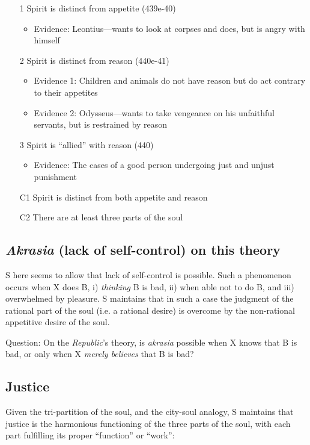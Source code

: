 \documentclass[oneside]{article}
\begin{document}
\begin{enumerate}
\item[1] Spirit is distinct from appetite (439e-40)
\begin{itemize}
\item Evidence: Leontius---wants to look at corpses and does, but is angry with himself
\end{itemize}
\item[2] Spirit is distinct from reason (440e-41)
\begin{itemize}
\item Evidence 1: Children and animals do not have reason but do act contrary to their appetites
\item Evidence 2: Odysseus---wants to take vengeance on his unfaithful servants, but is restrained by reason
\end{itemize}
\item[3] Spirit is ``allied'' with reason (440)
\begin{itemize}
\item Evidence: The cases of a good person undergoing just and unjust punishment
\end{itemize}
\item[C1] Spirit is distinct from both appetite and reason
\item[C2] There are at least three parts of the soul
\end{enumerate}

\subsection*{\emph{Akrasia} (lack of self-control) on this theory}

S here seems to allow that lack of self-control is possible. Such a phenomenon occurs when  X does B, i) \emph{thinking} B is bad, ii) when able not to do B, and iii) overwhelmed by pleasure. S maintains that in such a case the judgment of the rational part of the soul (i.e. a rational desire) is overcome by the non-rational appetitive desire of the soul.

\noindent Question: On the \emph{Republic}'s theory, is \emph{akrasia} possible when X knows that B is bad, or only when X \emph{merely believes} that B is bad?

\subsection*{Justice}

Given the tri-partition of the soul, and the city-soul analogy, S maintains that justice is the harmonious functioning of the three parts of the soul, with each part fulfilling its proper ``function'' or ``work'': 
\end{document}
